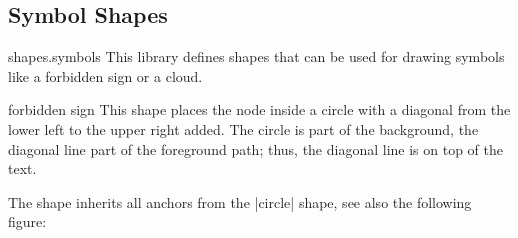 \subsection{Symbol Shapes}

\begin{pgflibrary}{shapes.symbols}
  This library defines shapes that can be used for drawing symbols
  like a forbidden sign or a cloud.
\end{pgflibrary}



\begin{shape}{forbidden sign}
  This shape places the node inside a circle with a diagonal from the
  lower left to the upper right added. The circle is part of the
  background, the diagonal line part of the foreground path; thus, the
  diagonal line is on top of the text.
  
\begin{codeexample}[]
\end{codeexample}

  The shape inherits all anchors from the |circle| shape, see also the
  following figure:
\begin{codeexample}[]
\Huge
{}
\end{codeexample}
\end{shape}


